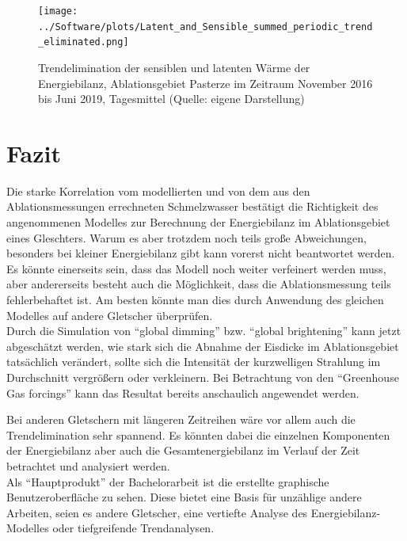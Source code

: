 \documentclass[11pt,a4paper]{article}
\begin{document}
\begin{figure}[H]
\centering
\texttt{[image: ../Software/plots/Latent\_and\_Sensible\_summed\_periodic\_trend\_eliminated.png]}
\caption[Trendelimination der sensiblen und latenten Wärme der Energiebilanz, Ablationsgebiet Pasterze im Zeitraum November 2016 bis Juni 2019, Tagesmittel]{Trendelimination der sensiblen und latenten Wärme der Energiebilanz, Ablationsgebiet Pasterze im Zeitraum November 2016 bis Juni 2019, Tagesmittel (Quelle: eigene Darstellung)}
\label{fig:Trendelimination der sensiblen und latenten Wärme der Energiebilanz}
\end{figure}


\pagebreak
\section{Fazit}
Die starke Korrelation vom modellierten und von dem aus den Ablationsmessungen errechneten Schmelzwasser bestätigt die Richtigkeit des angenommenen Modelles zur Berechnung der Energiebilanz im Ablationsgebiet eines Gleschters. Warum es aber trotzdem noch teils große Abweichungen, besonders bei kleiner Energiebilanz gibt kann vorerst nicht beantwortet werden. Es könnte einerseits sein, dass das Modell noch weiter verfeinert werden muss, aber andererseits besteht auch die Möglichkeit, dass die Ablationsmessung teils fehlerbehaftet ist. Am besten könnte man dies durch Anwendung des gleichen Modelles auf andere Gletscher überprüfen.\\

Durch die Simulation von ``global dimming'' bzw. ``global brightening'' kann jetzt abgeschätzt werden, wie stark sich die Abnahme der Eisdicke im Ablationsgebiet tatsächlich verändert, sollte sich die Intensität der kurzwelligen Strahlung im Durchschnitt vergrößern oder verkleinern. Bei Betrachtung von den ``Greenhouse Gas forcings'' kann das Resultat bereits anschaulich angewendet werden.

Bei anderen Gletschern mit längeren Zeitreihen wäre vor allem auch die Trendelimination sehr spannend. Es könnten dabei die einzelnen Komponenten der Energiebilanz aber auch die Gesamtenergiebilanz im Verlauf der Zeit betrachtet und analysiert werden.\\

Als ``Hauptprodukt'' der Bachelorarbeit ist die erstellte graphische Benutzeroberfläche zu sehen. Diese bietet eine Basis für unzählige andere Arbeiten, seien es andere Gletscher, eine vertiefte Analyse des Energiebilanz-Modelles oder tiefgreifende Trendanalysen.  
\end{document}
